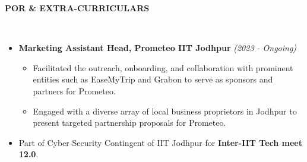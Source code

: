 \documentclass[a4paper,10pt]{article}
\newcommand{\resheading}[1]{{\small \colorbox{mygrey}{\begin{minipage}{0.99\textwidth}{\textbf{#1 \vphantom{p^{E}}}}\end{minipage}}}}
\begin{document}

\noindent
\resheading{\textbf{POR \& EXTRA-CURRICULARS}}\\[-0.4cm]
\begin{itemize}
\setlength\itemsep{-0.4em}
\item \textbf{Marketing Assistant Head, Prometeo IIT Jodhpur} \hfill \emph{(2023 - Ongoing)}
\begin{itemize}[noitemsep,nolistsep]
    \item Facilitated the outreach, onboarding, and collaboration with prominent entities such as EaseMyTrip and Grabon to serve as sponsors and partners for Prometeo.
    \item Engaged with a diverse array of local business proprietors in Jodhpur to present targeted partnership proposals for Prometeo.
\end{itemize}

\item Part of Cyber Security Contingent of IIT Jodhpur for \textbf{Inter-IIT Tech meet 12.0}.
\end{itemize}
\end{document}
